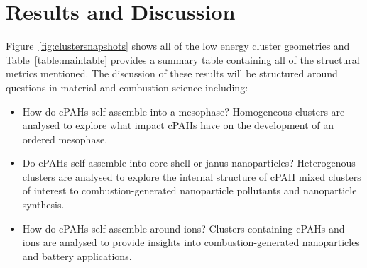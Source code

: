\section{Results and Discussion}
%
Figure~\ref{fig:clustersnapshots} shows all of the low energy cluster geometries and Table~\ref{table:maintable} provides a summary table containing all of the structural metrics mentioned. The discussion of these results will be structured around questions in material and combustion science including:
\begin{itemize}
\item How do cPAHs self-assemble into a mesophase? Homogeneous clusters are analysed to explore what impact cPAHs have on the development of an ordered mesophase. 
\item Do cPAHs self-assemble into core-shell or janus nanoparticles? Heterogenous clusters are analysed to explore the internal structure of cPAH mixed clusters of interest to combustion-generated nanoparticle pollutants and nanoparticle synthesis.
\item How do cPAHs self-assemble around ions? Clusters containing cPAHs and ions are analysed to provide insights into combustion-generated nanoparticles and battery applications. 
\end{itemize}

